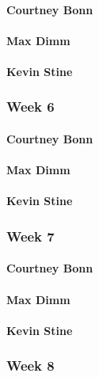 \documentclass[letterpaper,10pt,draftclsnofoot,onecolumn,titlepage]{IEEEtran}
\begin{document}
			\paragraph{Courtney Bonn}

			\paragraph{Max Dimm}
			
			\paragraph{Kevin Stine}
			
		\subsubsection{Week 6}
		
			\paragraph{Courtney Bonn}

			\paragraph{Max Dimm}
			
			\paragraph{Kevin Stine}
			
		\subsubsection{Week 7}
		
			\paragraph{Courtney Bonn}

			\paragraph{Max Dimm}
			
			\paragraph{Kevin Stine}
			
		\subsubsection{Week 8}
		
\end{document}
